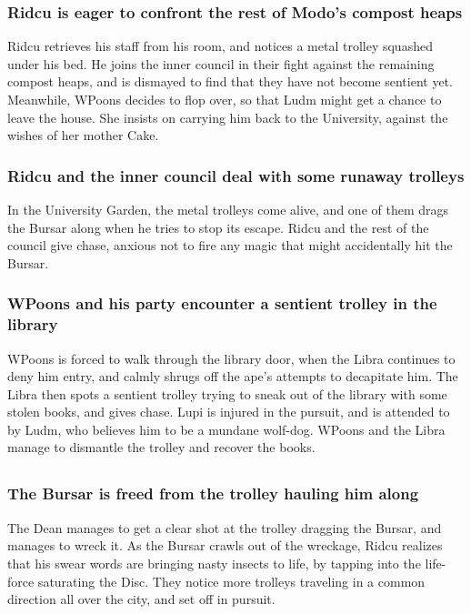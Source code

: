 \subsubsection{\Gls{Ridcu} is eager to confront the rest of \Gls{Modo}'s compost heaps}
\Gls{Ridcu} retrieves his staff from his room, and notices a metal trolley squashed under his bed.
He joins the inner council in their fight against the remaining compost heaps, and is dismayed to
find that they have not become sentient yet. Meanwhile, \Gls{WPoons} decides to flop over, so that
\Gls{Ludm} might get a chance to leave the house. She insists on carrying him back to the
University, against the wishes of her mother \Gls{Cake}.

\subsubsection{\Gls{Ridcu} and the inner council deal with some runaway trolleys}
In the University Garden, the metal trolleys come alive, and one of them drags the \Gls{Bursar}
along when he tries to stop its escape. \Gls{Ridcu} and the rest of the council give chase, anxious
not to fire any magic that might accidentally hit the \Gls{Bursar}.

\subsubsection{\Gls{WPoons} and his party encounter a sentient trolley in the library}
\Gls{WPoons} is forced to walk through the library door, when the \Gls{Libra} continues to deny
him entry, and calmly shrugs off the ape's attempts to decapitate him. The \Gls{Libra} then spots
a sentient trolley trying to sneak out of the library with some stolen books, and gives chase.
\Gls{Lupi} is injured in the pursuit, and is attended to by \Gls{Ludm}, who believes him to be a
mundane wolf-dog. \Gls{WPoons} and the \Gls{Libra} manage to dismantle the trolley and recover the
books.

\subsection{}
\subsubsection{The \Gls{Bursar} is freed from the trolley hauling him along}
The \Gls{Dean} manages to get a clear shot at the trolley dragging the \Gls{Bursar}, and manages to
wreck it. As the \Gls{Bursar} crawls out of the wreckage, \Gls{Ridcu} realizes that his swear words
are bringing nasty insects to life, by tapping into the life-force saturating the Disc. They notice
more trolleys traveling in a common direction all over the city, and set off in pursuit.

